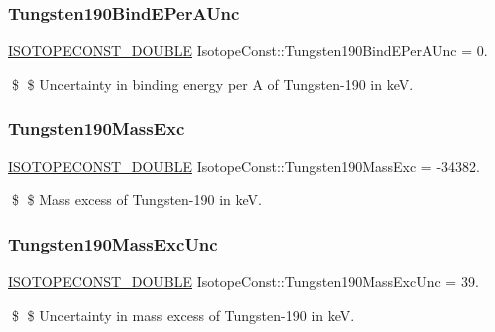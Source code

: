 \subsubsection{\texorpdfstring{Tungsten190\+Bind\+E\+Per\+A\+Unc}{Tungsten190BindEPerAUnc}}
{\footnotesize\ttfamily \mbox{\hyperlink{group___isotope_const-_macros_ga8f45a7272ce02c0b4c65c44636ed719a}{I\+S\+O\+T\+O\+P\+E\+C\+O\+N\+S\+T\+\_\+\+D\+O\+U\+B\+LE}} Isotope\+Const\+::\+Tungsten190\+Bind\+E\+Per\+A\+Unc = 0.}

\$ \$ Uncertainty in binding energy per A of Tungsten-\/190 in keV. \mbox{\label{group___isotope_const-_tungsten-_w190_ga812ff7c3a8961940957f93e02cc65ab1}} 
\subsubsection{\texorpdfstring{Tungsten190\+Mass\+Exc}{Tungsten190MassExc}}
{\footnotesize\ttfamily \mbox{\hyperlink{group___isotope_const-_macros_ga8f45a7272ce02c0b4c65c44636ed719a}{I\+S\+O\+T\+O\+P\+E\+C\+O\+N\+S\+T\+\_\+\+D\+O\+U\+B\+LE}} Isotope\+Const\+::\+Tungsten190\+Mass\+Exc = -\/34382.}

\$ \$ Mass excess of Tungsten-\/190 in keV. \mbox{\label{group___isotope_const-_tungsten-_w190_ga7485f52c9c6fb61bc90b0b260631d979}} 
\subsubsection{\texorpdfstring{Tungsten190\+Mass\+Exc\+Unc}{Tungsten190MassExcUnc}}
{\footnotesize\ttfamily \mbox{\hyperlink{group___isotope_const-_macros_ga8f45a7272ce02c0b4c65c44636ed719a}{I\+S\+O\+T\+O\+P\+E\+C\+O\+N\+S\+T\+\_\+\+D\+O\+U\+B\+LE}} Isotope\+Const\+::\+Tungsten190\+Mass\+Exc\+Unc = 39.}

\$ \$ Uncertainty in mass excess of Tungsten-\/190 in keV. \mbox{\label{group___isotope_const-_tungsten-_w190_gaadd98049b39933ce99c3fdc2dcc5752d}} 
